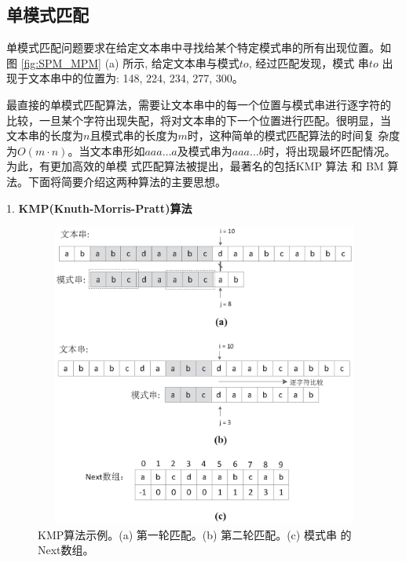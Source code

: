 \subsection{单模式匹配}

单模式匹配问题要求在给定文本串中寻找给某个特定模式串的所有出现位置。如
图 \ref{fig:SPM_MPM} (a) 所示, 给定文本串与模式$to$, 经过匹配发现，模式
串$to$ 出现于文本串中的位置为: 148, 224, 234, 277, 300。

最直接的单模式匹配算法，需要让文本串中的每一个位置与模式串进行逐字符的
比较，一旦某个字符出现失配，将对文本串的下一个位置进行匹配。很明显，当
文本串的长度为$n$且模式串的长度为$m$时，这种简单的模式匹配算法的时间复
杂度为$O(m \cdot n)$。当文本串形如$aaa \dots
a$及模式串为$aaa \dots b$时，将出现最坏匹配情况。为此，有更加高效的单模
式匹配算法被提出，最著名的包括KMP \cite{Knuth1977}算法 和 BM
\cite{Boyer1977} 算法。下面将简要介绍这两种算法的主要思想。

\vspace{0.4cm} 1. \textbf{KMP(Knuth-Morris-Pratt)算法}

\begin{figure}[H]
  \centering
  \includegraphics[height=10cm ,width=12cm]{figures/1_Introduction/KMP.eps}
  \caption{KMP算法示例。(a) 第一轮匹配。(b) 第二轮匹配。(c) 模式串
    的Next数组。}
  \label{fig:KMP}
\end{figure}

